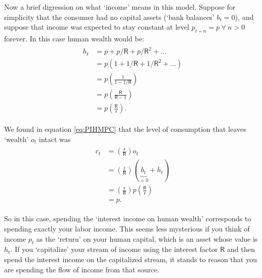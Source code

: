 \documentclass{scrartcl}
\begin{document}
Now a  brief digression on what `income' means in this model.
Suppose
for simplicity that the consumer had no capital assets (`bank balances' $\boldsymbol{\mathit{b}}_{t}=0$), and suppose
that income was expected to stay constant at level $\boldsymbol{\mathit{p}}_{t+n}=\boldsymbol{\mathit{p}}~\forall~n>0$ forever.
In this case human wealth would be:
\begin{equation*}
  \begin{gathered}
    \begin{aligned}
        \boldsymbol{\mathit{h}}_{t} & = \boldsymbol{\mathit{p}}+\boldsymbol{\mathit{p}}/\mathsf{R}+\boldsymbol{\mathit{p}}/\mathsf{R}^{2}+\ldots  \\
         & = \boldsymbol{\mathit{p}}(1+1/\mathsf{R}+1/\mathsf{R}^{2}+\ldots)  \\
         & = \boldsymbol{\mathit{p}}\left(\frac{1}{1-1/\mathsf{R}}\right)
\\   & = \boldsymbol{\mathit{p}}\left(\frac{\mathsf{R}}{\mathsf{R} -1}\right)
\\   & = \boldsymbol{\mathit{p}}\left(\frac{\mathsf{R}}{\mathsf{r}}\right)
.
\end{aligned}
\end{gathered}
\end{equation*}


We found in equation \eqref{eq:PIHMPC} that 
the level of consumption that leaves `wealth' $\boldsymbol{\mathit{o}}_{t}$ intact
was
\begin{equation}\begin{gathered}\begin{aligned}
        \boldsymbol{\mathit{c}}_{t} & =  \left(\frac{\mathsf{r}}{\mathsf{R}}\right) \boldsymbol{\mathit{o}}_{t}  \\
         & =  \left(\frac{\mathsf{r}}{\mathsf{R}}\right) (\underbrace{\boldsymbol{\mathit{b}}_{t}}_{=0}+\boldsymbol{\mathit{h}}_{t}) \\
                        & =  \left(\frac{\mathsf{r}}{\mathsf{R}}\right)     \boldsymbol{\mathit{p}} \left(\frac{\mathsf{R}}{\mathsf{r}}\right)\\
                        & =  \boldsymbol{\mathit{p}}.
\end{aligned}\end{gathered}\end{equation}

So in this case, spending the `interest income on human wealth' 
corresponds to spending exactly your labor income.
This seems less 
mysterious if you think of income $\boldsymbol{\mathit{p}}_{t}$ as the `return' on your 
human capital, which is an asset whose value is $\boldsymbol{\mathit{h}}_{t}$.
If you `capitalize' your stream of 
income using the interest factor $\mathsf{R}$ and then spend the interest income on the 
capitalized stream, it stands to reason that you are spending the flow 
of income from that source.
\end{document}
